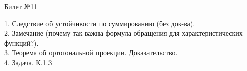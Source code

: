 \documentclass[preview]{standalone}
\begin{document}
 
\begin{center} {\Large Билет №11} \end{center} 

1.  Следствие об устойчивости по суммированию (без док-ва).\\

2.  Замечание (почему так важна формула обращения для характеристических функций?).\\

3.  Теорема об ортогональной проекции. Доказательство.\\

4. Задача. К.1.3\\
\end{document}
